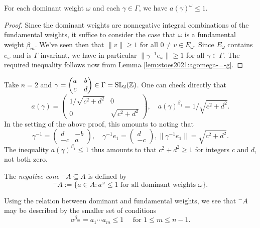 \documentclass[reqno]{amsart} 
\begin{document}
\begin{lemma}\label{lem:stoes2021:each-dominant-weight}
  For each dominant weight $\omega$ and each $\gamma \in \Gamma$, we have $a(\gamma)^{\omega} \leq 1$.
\end{lemma}
\begin{proof}
  Since the dominant weights are nonnegative integral combinations of the fundamental weights, it suffice to consider the case that $\omega$ is a fundamental weight $\beta_m$.  We've seen then that $\|v\| \geq 1$ for all $0 \neq v \in E_\omega$.  Since $E_\omega$ contains $e_\omega$ and is $\Gamma$-invariant, we have in particular $\|\gamma^{-1} e_\omega \| \geq 1$ for all $\gamma \in \Gamma$.  The required inequality follows now from Lemma \ref{lem:stoes2021:agomega-=-g}.
\end{proof}

\begin{example}
  Take $n = 2$ and $\gamma =
  \begin{pmatrix}
    a & b \\
    c & d
  \end{pmatrix}
  \in \Gamma = \operatorname{SL}_2(\mathbb{Z})$.  One can check directly that
  \begin{equation*}
    a (\gamma ) = 
    \begin{pmatrix}
      1/ \sqrt{c^2 + d^2} & 0 \\
      0 & \sqrt{c^2 + d^2}
    \end{pmatrix}
    , \quad a(\gamma)^{\beta_1} = 1/ \sqrt{c^2 + d^2}.
  \end{equation*}
  In the setting of the above proof, this amounts to noting that
  \begin{equation*}
    \gamma^{-1} = 
    \begin{pmatrix}
      d & -b \\
      -c & a
    \end{pmatrix}
    , \quad \gamma^{-1} e_1 = 
    \begin{pmatrix}
      d  \\
      -c
    \end{pmatrix}
    , \|\gamma^{-1} e_1\| = \sqrt{c^2 + d^2}.
  \end{equation*}
  The inequality $a(\gamma)^{\beta_1} \leq 1$ thus amounts to that $c^2 + d^2 \geq 1$ for integers $c$ and $d$, not both zero.
\end{example}

\begin{definition}
  The \emph{negative cone} ${}^-A \subseteq A$ is defined by
  \begin{equation*} {}^- A := \{a \in A : a^{\omega} \leq 1 \text{ for all dominant weights } \omega \}.
  \end{equation*}
\end{definition}
Using the relation between dominant and fundamental weights, we see that ${}^- A$ may be described by the smaller set of conditions
\begin{equation*}
  a^{\beta_m} = a_1 \dotsb a_m \leq 1 \quad \text{ for } 1 \leq m \leq n-1.
\end{equation*}
\end{document}
